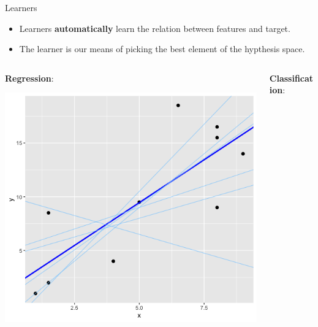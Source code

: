 \documentclass[11pt,compress,t,notes=noshow, xcolor=table]{beamer}
\begin{document}
\begin{vbframe}{Learners}

\begin{itemize}
\small
\item \small Learners \textbf{automatically} learn the relation between features and target.
\item \small The learner is our means of picking the best element of the hypthesis space.
\end{itemize}

\begin{columns}    
\begin{column}{0.3\textwidth} 
\small \textbf{Regression}: 

  \begin{center}
    \includegraphics[width=\textwidth]{figure_man/Model_Regression_Plot.png} 
  \end{center}
\end{column}    

\begin{column}{0.3\textwidth} 
\small \textbf{Classification}:
  

\end{column}
\end{columns}
\end{vbframe}
\end{document}
